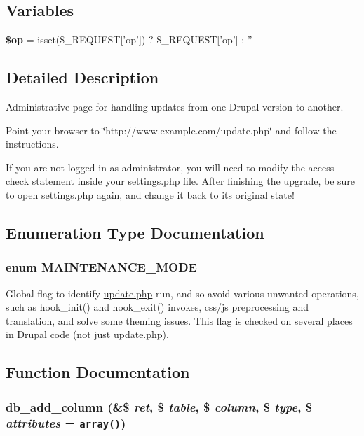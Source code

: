 \subsection*{Variables}
\begin{CompactItemize}
\item 
\hypertarget{update_8php_7c93a81c9b28ec2f78f33cdabda28c76}{
\textbf{\$op} = isset(\$\_\-REQUEST\mbox{[}'op'\mbox{]}) ? \$\_\-REQUEST\mbox{[}'op'\mbox{]} : ''}
\label{update_8php_7c93a81c9b28ec2f78f33cdabda28c76}

\end{CompactItemize}


\subsection{Detailed Description}
Administrative page for handling updates from one Drupal version to another.

Point your browser to \char`\"{}http://www.example.com/update.php\char`\"{} and follow the instructions.

If you are not logged in as administrator, you will need to modify the access check statement inside your settings.php file. After finishing the upgrade, be sure to open settings.php again, and change it back to its original state! 

\subsection{Enumeration Type Documentation}
\hypertarget{update_8php_5bf6dfe9ba7ee16c648e3932aa76535d}{
\subsubsection[{MAINTENANCE\_\-MODE}]{\setlength{\rightskip}{0pt plus 5cm}enum {\bf MAINTENANCE\_\-MODE}}}
\label{update_8php_5bf6dfe9ba7ee16c648e3932aa76535d}


Global flag to identify \hyperlink{update_8php}{update.php} run, and so avoid various unwanted operations, such as hook\_\-init() and hook\_\-exit() invokes, css/js preprocessing and translation, and solve some theming issues. This flag is checked on several places in Drupal code (not just \hyperlink{update_8php}{update.php}). 

\subsection{Function Documentation}
\hypertarget{update_8php_68749bcc3e7949ede51c5dd2db91f39e}{
\subsubsection[{db\_\-add\_\-column}]{\setlength{\rightskip}{0pt plus 5cm}db\_\-add\_\-column (\&\$ {\em ret}, \/  \$ {\em table}, \/  \$ {\em column}, \/  \$ {\em type}, \/  \$ {\em attributes} = {\tt array()})}}
\label{update_8php_68749bcc3e7949ede51c5dd2db91f39e}


